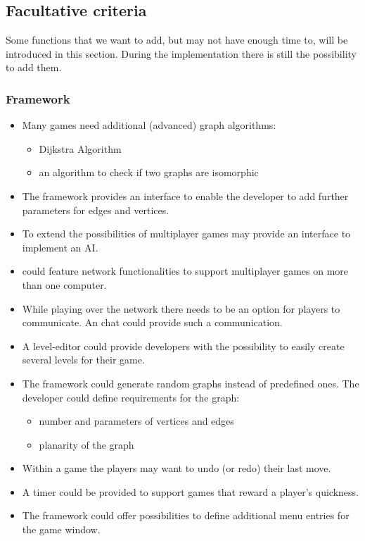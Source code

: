 \pagebreak
\subsection{Facultative criteria}\label{REF:FACULTATIVE-CRITERIA}
Some functions that we want to add, but may not have enough time to, will be introduced in this section. During the implementation there is still the possibility to add them.

\subsubsection{Framework}
\begin{itemize}

	\item Many \glspl{game} need additional (advanced) \gls{graph} \glspl{algorithm}:
	\begin{itemize}
		\item Dijkstra Algorithm
		\item an algorithm to check if two graphs are isomorphic
	\end{itemize}

	\item The framework provides an interface to enable the developer to add further parameters for edges and vertices.
	\item To extend the possibilities of multiplayer games \graphioli may provide an interface to implement an \gls{AI}.

	\item \graphioli could feature network functionalities to support multiplayer games on more than one computer.

	\item While playing over the network there needs to be an option for players to communicate. An \gls{chat} could provide such a communication.

	\item A \gls{level-editor} could provide \glspl{developer} with the possibility to easily create several levels for their game.

	\item The framework could generate random graphs instead of predefined ones. The developer could define requirements for the graph:
	\begin{itemize}
		\item number and parameters of vertices and edges
		\item planarity of the graph
	\end{itemize}

	\item Within a game the players may want to \gls{undo} (or \gls{redo}) their last move.

	\item A timer could be provided to support games that reward a player's quickness.

	\item The framework could offer possibilities to define additional menu entries for the game window.

\end{itemize}

